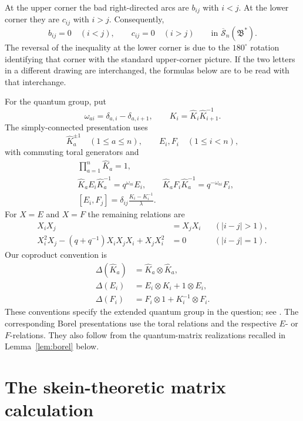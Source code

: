 \documentclass[11pt]{amsart}
\theoremstyle{remark}
\newcommand{\rSk}{\overline{\mathscr S}_n}
\newcommand{\Bstar}{\mathfrak B^{*}}
\begin{document}
At the upper corner the bad right-directed arcs are $b_{ij}$ with
$i<j$.  At the lower corner they are $c_{ij}$ with $i>j$.
Consequently,
\begin{equation}\label{eq:triangular}
 b_{ij}=0\quad(i<j),\qquad
 c_{ij}=0\quad(i>j)
 \qquad\text{in }\rSk(\Bstar).
\end{equation}
The reversal of the inequality at the lower corner is due to the
$180^\circ$ rotation identifying that corner with the standard
upper-corner picture.  If the two letters in a different drawing
are interchanged, the formulas below are to be read with that
interchange.

For the quantum group, put
\[
 \omega_{ai}=\delta_{a,i}-\delta_{a,i+1},
 \qquad
 K_i=\widehat K_i\widehat K_{i+1}^{-1}.
\]
The simply-connected presentation uses
\[
 \widehat K_a^{\pm1}\quad(1\leq a\leq n),
 \qquad E_i,F_i\quad(1\leq i<n),
\]
with commuting toral generators and
\begin{align}
 &\prod_{a=1}^n\widehat K_a=1,
 \label{eq:torus-product}\\
 &\widehat K_a E_i\widehat K_a^{-1}=q^{\omega_{ai}}E_i,
 \qquad
 \widehat K_a F_i\widehat K_a^{-1}=q^{-\omega_{ai}}F_i,
 \label{eq:torus-weights}\\
 &[E_i,F_j]=\delta_{ij}\frac{K_i-K_i^{-1}}{\lambda}.
 \label{eq:DJ-comm}
\end{align}
For $X=E$ and $X=F$ the remaining relations are
\begin{align}
 X_iX_j&=X_jX_i &&(|i-j|>1),\label{eq:far}\\
 X_i^2X_j-(q+q^{-1})X_iX_jX_i+X_jX_i^2&=0
 &&(|i-j|=1).\label{eq:Serre}
\end{align}
Our coproduct convention is
\begin{equation}\label{eq:coproduct}
 \begin{split}
 \Delta(\widehat K_a)&=\widehat K_a\otimes\widehat K_a,\\
 \Delta(E_i)&=E_i\otimes K_i+1\otimes E_i,\\
 \Delta(F_i)&=F_i\otimes1+K_i^{-1}\otimes F_i.
 \end{split}
\end{equation}
These conventions specify the extended quantum group in the
question; see \cite{KS}.  The corresponding Borel presentations
use the toral relations and the respective $E$- or $F$-relations.
They also follow from the quantum-matrix realizations recalled in
Lemma~\ref{lem:borel} below.

\section{The skein-theoretic matrix calculation}
\end{document}

